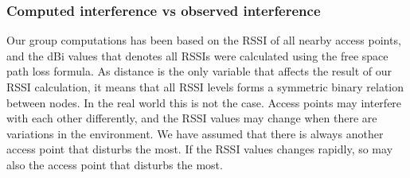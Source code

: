 \subsubsection{Computed interference vs observed interference}
Our group computations has been based on the RSSI of all nearby access points, and the dBi values that denotes all RSSIs were calculated using the free space path loss formula.
As distance is the only variable that affects the result of our RSSI calculation, it means that all RSSI levels forms a symmetric binary relation between nodes. In the real world 
this is not the case. Access points may interfere with each other differently, and the RSSI values may change when there are variations in the environment. We have assumed
that there is always another access point that disturbs the most. If the RSSI values changes rapidly, so may also the access point that disturbs the most. 

